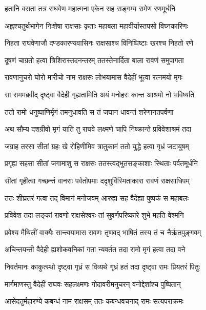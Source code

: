 \twolineshloka
{हतानि वसता तत्र राघवेण महात्मना}
{एकेन सह सङ्गम्य रामेण रणमूर्धनि} %

\twolineshloka
{अह्नश्चतुर्थभागेन निःशेषा राक्षसाः कृताः}
{महाबला महावीर्यास्तपसो विघ्नकारिणः} %

\twolineshloka
{निहता राघवेणाजौ दण्डकारण्यवासिनः}
{राक्षसाश्च विनिष्पिष्टाः खरश्च निहतो रणे} %

\twolineshloka
{दूषणं चाग्रतो हत्वा त्रिशिरास्तदनन्तरम्}
{ततस्तेनार्दिता बाला रावणं समुपागता} %

\twolineshloka
{रावणानुचरो घोरो मारीचो नाम राक्षसः}
{लोभयामास वैदेहीं भूत्वा रत्नमयो मृगः} %

\twolineshloka
{सा राममब्रवीद् दृष्ट्वा वैदेही गृह्यतामिति}
{अयं मनोहरः कान्त आश्रमो नो भविष्यति} %

\twolineshloka
{ततो रामो धनुष्पाणिर्मृगं तमनुधावति}
{स तं जघान धावन्तं शरेणानतपर्वणा} %

\twolineshloka
{अथ सौम्य दशग्रीवो मृगं याति तु राघवे}
{लक्ष्मणे चापि निष्क्रान्ते प्रविवेशाश्रमं तदा} %

\twolineshloka
{जग्राह तरसा सीतां ग्रहः खे रोहिणीमिव}
{त्रातुकामं ततो युद्धे हत्वा गृध्रं जटायुषम्} %

\twolineshloka
{प्रगृह्य सहसा सीतां जगामाशु स राक्षसः}
{ततस्त्वद्भुतसङ्काशाः स्थिताः पर्वतमूर्धनि} %

\twolineshloka
{सीतां गृहीत्वा गच्छन्तं वानराः पर्वतोपमाः}
{ददृशुर्विस्मिताकारा रावणं राक्षसाधिपम्} %

\twolineshloka
{ततः शीघ्रतरं गत्वा तद् विमानं मनोजवम्}
{आरुह्य सह वैदेह्या पुष्पकं स महाबलः} %

\twolineshloka
{प्रविवेश तदा लङ्कां रावणो राक्षसेश्वरः}
{तां सुवर्णपरिष्कारे शुभे महति वेश्मनि} %

\twolineshloka
{प्रवेश्य मैथिलीं वाक्यैः सान्त्वयामास रावणः}
{तृणवद् भाषितं तस्य तं च नैर्ऋतपुङ्गवम्} %

\twolineshloka
{अचिन्तयन्ती वैदेही ह्यशोकवनिकां गता}
{न्यवर्तत तदा रामो मृगं हत्वा तदा वने} %

\twolineshloka
{निवर्तमानः काकुत्स्थो दृष्ट्वा गृध्रं स विव्यथे}
{गृध्रं हतं तदा दृष्ट्वा रामः प्रियतरं पितुः} %

\twolineshloka
{मार्गमाणस्तु वैदेहीं राघवः सहलक्ष्मणः}
{गोदावरीमनुचरन् वनोद्देशांश्च पुष्पितान्} %

\twolineshloka
{आसेदतुर्महारण्ये कबन्धं नाम राक्षसम्}
{ततः कबन्धवचनाद् रामः सत्यपराक्रमः} %

